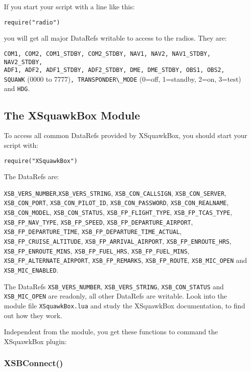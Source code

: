 \documentclass[11pt,parskip=half,a4paper]{scrartcl}
\begin{document}
If you start your script with a line like this:

\verb|require("radio")|

you will get all major DataRefs writable to access to the radios. They are:

\verb|COM1, COM2, COM1_STDBY, COM2_STDBY, NAV1, NAV2, NAV1_STDBY, NAV2_STDBY,|\\
\verb|ADF1, ADF2, ADF1_STDBY, ADF2_STDBY, DME, DME_STDBY, OBS1, OBS2,|\\
\verb|SQUAWK| (0000 to 7777)\verb|, TRANSPONDER\_MODE| (0=off, 1=standby, 2=on, 3=test) and \verb|HDG|.

\subsection{The XSquawkBox Module}

To access all common DataRefs provided by XSquawkBox, you should start your script with:

\verb|require("XSquawkBox")|

The DataRefs are:

\begin{flushleft}
\verb|XSB_VERS_NUMBER|,\verb|XSB_VERS_STRING|, \verb|XSB_CON_CALLSIGN|, \verb|XSB_CON_SERVER|, \verb|XSB_CON_PORT|, \verb|XSB_CON_PILOT_ID|, \verb|XSB_CON_PASSWORD|, \verb|XSB_CON_REALNAME|, \verb|XSB_CON_MODEL|, \verb|XSB_CON_STATUS|, \verb|XSB_FP_FLIGHT_TYPE|, \verb|XSB_FP_TCAS_TYPE|, \verb|XSB_FP_NAV_TYPE|, \verb|XSB_FP_SPEED|, \verb|XSB_FP_DEPARTURE_AIRPORT|, \verb|XSB_FP_DEPARTURE_TIME|, \verb|XSB_FP_DEPARTURE_TIME_ACTUAL|, \verb|XSB_FP_CRUISE_ALTITUDE|, \verb|XSB_FP_ARRIVAL_AIRPORT|, \verb|XSB_FP_ENROUTE_HRS|, \verb|XSB_FP_ENROUTE_MINS|, \verb|XSB_FP_FUEL_HRS|, \verb|XSB_FP_FUEL_MINS|, \verb|XSB_FP_ALTERNATE_AIRPORT|, \verb|XSB_FP_REMARKS|, \verb|XSB_FP_ROUTE|, \verb|XSB_MIC_OPEN| and \verb|XSB_MIC_ENABLED|.
\end{flushleft}

The DataRefs \verb|XSB_VERS_NUMBER|, \verb|XSB_VERS_STRING|, \verb|XSB_CON_STATUS| and \verb|XSB_MIC_OPEN| are readonly, all other DataRefs are  writable. Look into the module file \verb|XSquawkBox.lua| and study the XSquawkBox documentation, to find out how they work.

Independent from the module, you get these functions to command the XSquawkBox plugin:

\subsubsection{XSBConnect()}
\end{document}
